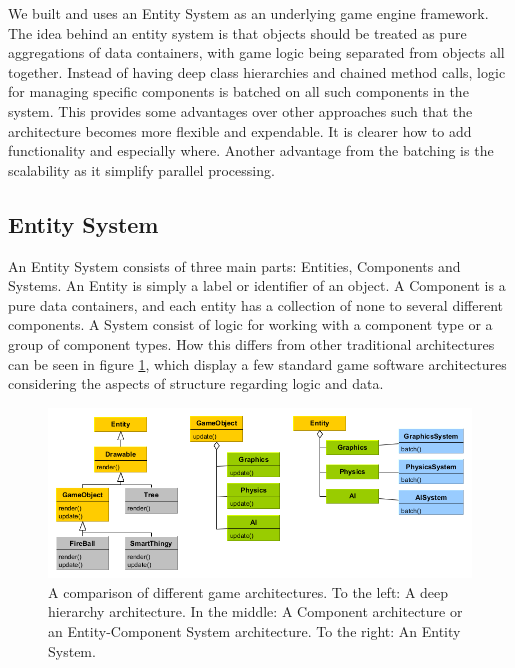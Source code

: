 We built and uses an Entity System as an underlying game engine framework.
The idea behind an entity system is that objects should be treated as pure aggregations of data containers, with game logic being separated from objects all together. Instead of having deep class hierarchies and chained method calls, logic for managing specific components is batched on all such components in the system. This provides some advantages over other approaches such that the architecture becomes more flexible and expendable. It is clearer how to add functionality and especially where. Another advantage from the batching is the scalability as it simplify parallel processing.

\subsection{Entity System}
An Entity System consists of three main parts: Entities, Components and Systems.
An Entity is simply a label or identifier of an object. A Component is a pure data containers, and each entity has a collection of none to several different components. A System consist of logic for working with a component type or a group of component types. How this differs from other traditional architectures can be seen in figure \ref{fig:SoftwareArchitectures}, which display a few standard game software architectures considering the aspects of structure regarding logic and data.
\begin{figure}[H]
  \centering
  \includegraphics[width=\linewidth]{images/softwareArchitectures.png}
  \caption{A comparison of different game architectures. 
  To the left: A deep hierarchy architecture. 
  In the middle: A Component architecture or an Entity-Component System architecture. 
  To the right: An Entity System.}
  \label{fig:SoftwareArchitectures}
\end{figure}

